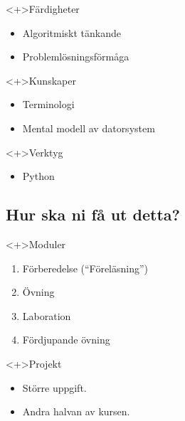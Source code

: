 \begin{frame}
  \begin{block}<+>{Färdigheter}
    \begin{itemize}
      \item Algoritmiskt tänkande
      \item Problemlösningsförmåga
    \end{itemize}
  \end{block}

  \begin{block}<+>{Kunskaper}
    \begin{itemize}
      \item Terminologi
      \item Mental modell av datorsystem
    \end{itemize}
  \end{block}

  \begin{block}<+>{Verktyg}
    \begin{itemize}
      \item Python
    \end{itemize}
  \end{block}
\end{frame}

\subsection{Hur ska ni få ut detta?}

\begin{frame}
  \begin{block}<+>{Moduler}
    \begin{enumerate}
      \item Förberedelse (\enquote{Föreläsning})
      \item Övning
      \item Laboration
      \item Fördjupande övning
    \end{enumerate}
  \end{block}

  \begin{block}<+>{Projekt}
    \begin{itemize}
      \item Större uppgift.
      \item Andra halvan av kursen.
    \end{itemize}
  \end{block}
\end{frame}

